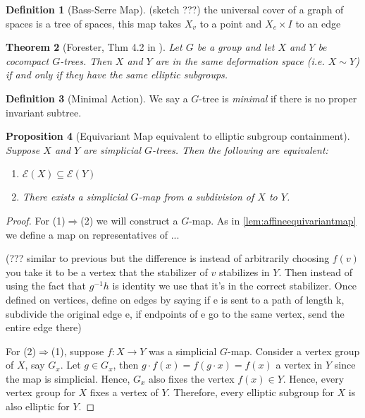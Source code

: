\documentclass[12pt,parskip=full]{report}
\theoremstyle{plain}
\newtheorem{thm}{Theorem}[section]
\newtheorem{prop}[thm]{Proposition}
\theoremstyle{definition}
\newtheorem{dfn}[thm]{Definition}
\begin{document}
\begin{dfn}
    [Bass-Serre Map]
    \label{defn:bsmap}
    (sketch ???)
    the universal cover of a graph of spaces is a tree of spaces, this map takes $X_v$ to a point and $X_e \times I$ to an edge
\end{dfn}

\begin{thm}[Forester, Thm 4.2 in \cite{foresterdeformationrigidity}]
\label{thm:forester}
Let $G$ be a group and let $X$ and $Y$ be cocompact $G$-trees. Then $X$ and $Y$ are in the same deformation space (i.e. $X\sim Y$) if and only if they have the same elliptic subgroups.
\end{thm}

\begin{dfn}
    [Minimal Action]
    \label{defn:minimal}
    We say a $G$-tree is \emph{minimal} if there is no proper invariant subtree.
\end{dfn}

\begin{prop}
[Equivariant Map equivalent to elliptic subgroup containment]
\label{pro:gmapfromsubset}
Suppose $X$ and $Y$ are simplicial \(G\)-trees. Then the following are equivalent:
\begin{enumerate}
    \item \(\mathcal{E}(X) \subseteq \mathcal{E}(Y)\)
    \item There exists a simplicial $G$-map from a subdivision of $X$ to $Y$.
\end{enumerate}
\end{prop}
\begin{proof}
    For (1)$\Rightarrow$(2) we will construct a $G$-map. As in \ref{lem:affineequivariantmap} we define a map on representatives of ...
    
    (??? similar to previous but the difference is instead of arbitrarily choosing \(f(v)\) you take it to be a vertex that the stabilizer of \(v\) stabilizes in \(Y\). Then instead of using the fact that \(g^{-1}h\) is identity we use that it's in the correct stabilizer. Once defined on vertices, define on edges by saying if e is sent to a path of length k, subdivide the original edge e, if endpoints of e go to the same vertex, send the entire edge there)
    
    
    
    For (2)$\Rightarrow$(1), suppose $f:X\to Y$ was a simplicial $G$-map. Consider a vertex group of $X$, say $G_x$. Let $g\in G_x$, then $g\cdot f(x)=f(g\cdot x)=f(x)$ a vertex in $Y$ since the map is simplicial. Hence, $G_x$ also fixes the vertex $f(x)\in Y$. Hence, every vertex group for $X$ fixes a vertex of $Y$. Therefore, every elliptic subgroup for $X$ is also elliptic for $Y$.
\end{proof}
\end{document}
